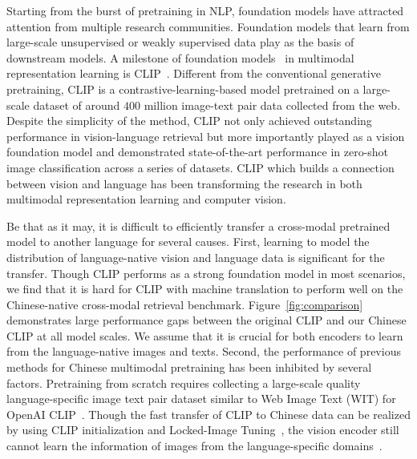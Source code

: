 \documentclass[11pt]{article}
\begin{document}
Starting from the burst of pretraining in NLP, foundation models have attracted attention from multiple research communities. 
Foundation models that learn from large-scale unsupervised or weakly supervised data play as the basis of downstream models. 
A milestone of foundation models~\citep{foundation_model} in multimodal representation learning is CLIP~\cite{clip}. 
Different from the conventional generative pretraining, CLIP is a contrastive-learning-based model pretrained on a large-scale dataset of around $400$ million image-text pair data collected from the web. 
Despite the simplicity of the method, CLIP not only achieved outstanding performance in vision-language retrieval but more importantly played as a vision foundation model and demonstrated state-of-the-art performance in zero-shot image classification across a series of datasets. 
CLIP which builds a connection between vision and language has been transforming the research in both multimodal representation learning and computer vision. 

Be that as it may, it is difficult to efficiently transfer a cross-modal pretrained model to another language for several causes. 
First, learning to model the distribution of language-native vision and language data is significant for the transfer. 
Though CLIP performs as a strong foundation model in most scenarios, we find that it is hard for CLIP with machine translation to perform well on the Chinese-native cross-modal retrieval benchmark.
Figure~\ref{fig:comparison} demonstrates large performance gaps between the original CLIP and our Chinese CLIP at all model scales. 
We assume that it is crucial for both encoders to learn from the language-native images and texts. 
Second, the performance of previous methods for Chinese multimodal pretraining has been inhibited by several factors. Pretraining from scratch requires collecting a large-scale quality language-specific image text pair dataset similar to Web Image Text (WIT) for OpenAI CLIP~\citep{wenlan, r2d2}. Though the fast transfer of CLIP to Chinese data can be realized by using CLIP initialization and Locked-Image Tuning~\citep{lit}, the vision encoder still cannot learn the information of images from the language-specific domains~\citep{wukong}. 
\end{document}
